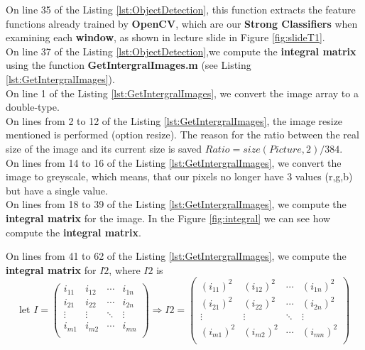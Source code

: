 \noindent On line 35 of the Listing \ref{lst:ObjectDetection}, this function extracts the feature functions already trained by \textbf{OpenCV}, which are our \textbf{Strong Classifiers} when examining each \textbf{window}, as shown in lecture slide in Figure \ref{fig:slideT1}.\\

\noindent On line 37 of the Listing \ref{lst:ObjectDetection},we compute the \textbf{integral matrix} using the function \textbf{GetIntergralImages.m} (see Listing \ref{lst:GetIntergralImages}).\\ 

\noindent On line 1 of the Listing \ref{lst:GetIntergralImages}, we convert the image array to a double-type.\\

\noindent On lines from 2 to 12 of the Listing \ref{lst:GetIntergralImages}, the image resize mentioned is performed (option resize). The reason for the ratio between the real size of the image and its current size is saved $Ratio=size(Picture,2)/384$.\\

\noindent On lines from 14 to 16 of the Listing \ref{lst:GetIntergralImages}, we convert the image to greyscale, which means, that our pixels no longer have 3 values (r,g,b) but have a single value.\\

\noindent On lines from 18 to 39 of the Listing \ref{lst:GetIntergralImages}, we compute the \textbf{integral matrix} for the image. In the Figure \ref{fig:integral} we can see how compute the  \textbf{integral matrix}.

\noindent On lines from 41 to 62 of the Listing \ref{lst:GetIntergralImages}, we compute the \textbf{integral matrix} for $I2$, where $I2$ is
\begin{equation}
	\text{let }	I=
	\begin{pmatrix}
		i_{11} & i_{12} & \cdots & i_{1n}\\
		i_{21} & i_{22} & \cdots & i_{2n}\\
		\vdots & \vdots & \ddots & \vdots\\
		i_{m1} & i_{m2} & \cdots & i_{mn}\\
	\end{pmatrix}
	\Rightarrow I2=
	\begin{pmatrix}
		(i_{11})^2 & (i_{12})^2 & \cdots & (i_{1n})^2\\
		(i_{21})^2 & (i_{22})^2 & \cdots & (i_{2n})^2\\
		\vdots & \vdots & \ddots & \vdots\\
		(i_{m1})^2 & (i_{m2})^2 & \cdots & (i_{mn})^{2}\\
	\end{pmatrix}
\end{equation}

